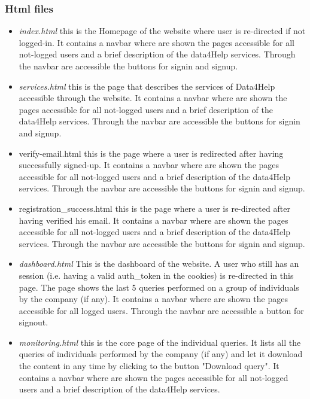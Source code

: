 \subsubsection{Html files}
\begin{itemize}
    \item \textit{index.html} this is the Homepage of the website where user is re-directed if not logged-in.
    It contains a navbar where are shown the pages accessible for all not-logged users and a brief description of the data4Help services.
    Through the navbar are accessible the buttons for signin and signup. 
    \item \textit{services.html} this is the page that describes the services of Data4Help accessible through the website.
    It contains a navbar where are shown the pages accessible for all not-logged users and a brief description of the data4Help services.
    Through the navbar are accessible the buttons for signin and signup. 
    \item verify-email.html this is the page where a user is redirected after having successfully signed-up.
    It contains a navbar where are shown the pages accessible for all not-logged users and a brief description of the data4Help services.
    Through the navbar are accessible the buttons for signin and signup. 
    \item registration\_success.html this is the page where a user is re-directed after having verified his email.
    It contains a navbar where are shown the pages accessible for all not-logged users and a brief description of the data4Help services.
    Through the navbar are accessible the buttons for signin and signup. 
    \item \textit{dashboard.html} This is the dashboard of the website.
    A user who still has an session (i.e. having a valid auth\_token in the cookies) is re-directed in this page.
    The page shows the last 5 queries performed on a group of individuals by the company (if any).
    It contains a navbar where are shown the pages accessible for all logged users.
    Through the navbar are accessible a button for signout.
    \item \textit{monitoring.html} this is the core page of the individual queries.
    It lists all the queries of individuals performed by the company (if any) and let it download the content in any time by clicking to the button "Download query".
    It contains a navbar where are shown the pages accessible for all not-logged users and a brief description of the data4Help services.

\end{itemize}
